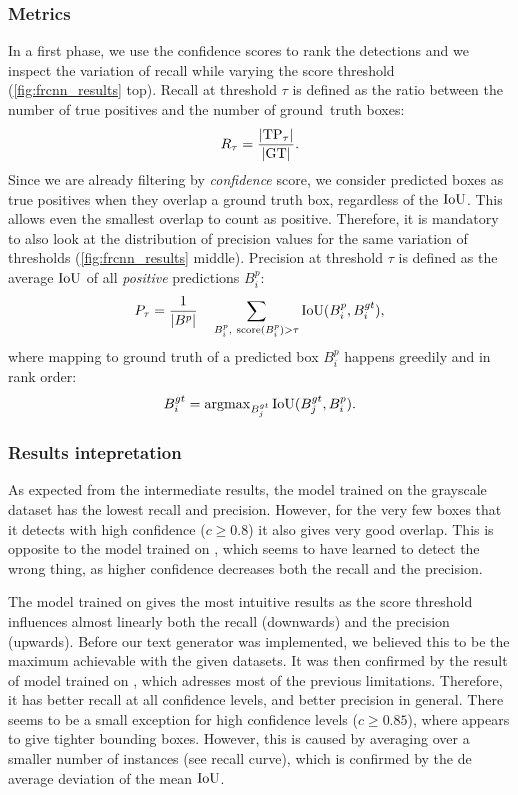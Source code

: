 		\subsubsection*{Metrics}
			In a first phase, we use the confidence scores to rank the detections and we inspect the variation of recall while varying the score threshold (\autoref{fig:frcnn_results} top). Recall at threshold \(\tau\) is defined as the ratio between the number of true positives and the number of \mbox{ground truth} boxes:
			\[
				R_{\tau} = \frac{\left\vert\operatorname{TP}_\tau\right\vert}{\left\vert\operatorname{GT}\right\vert}.
			\]
			Since we are already filtering by \emph{confidence} score, we consider predicted boxes as true positives when they overlap a ground truth box, regardless of the \(\operatorname{IoU}\). This allows even the smallest overlap to count as positive. Therefore, it is mandatory to also look at the distribution of precision values for the same variation of thresholds (\autoref{fig:frcnn_results} middle). Precision at threshold \(\tau\) is defined as the average \(\operatorname{IoU}\) of all \emph{positive} predictions \(B^p_i\):
			\[
					P_\tau = \frac{1}{\left\vert B^p\right\vert}~~~ \sum_{B^p_i,\ \operatorname{score}(B^p_i ) > \tau} \operatorname{IoU}(B^p_i, B^{gt}_i),
			\]
			where mapping to ground truth of a predicted box \(B^p_i\) happens greedily and in rank order:
			\[
					B^{gt}_i = \operatorname{argmax}_{B^{gt}_j} \operatorname{IoU}(B^{gt}_j, B^p_i).
			\]

		\subsubsection*{Results intepretation}
			As expected from the intermediate results, the model trained on the grayscale dataset  has the lowest recall and precision. However, for the very few boxes that it detects with high confidence (\(c \geq 0.8\)) it also gives very good overlap. This is opposite to the model trained on , which seems to have learned to detect the wrong thing, as higher confidence decreases both the recall and the precision.

			The model trained on  gives the most intuitive results as the score threshold influences almost linearly both the recall (downwards) and the precision (upwards). Before our text generator was implemented, we believed this to be the maximum achievable with the given datasets. It was then confirmed by the result of model trained on , which adresses most of the previous limitations. Therefore, it has better recall at all confidence levels, and better precision in general. There seems to be a small exception for high confidence levels (\(c \geq 0.85\)), where  appears to give tighter bounding boxes. However, this is caused by averaging over a smaller number of instances (see recall curve), which is confirmed by the de average deviation of the mean \(\operatorname{IoU}\).

